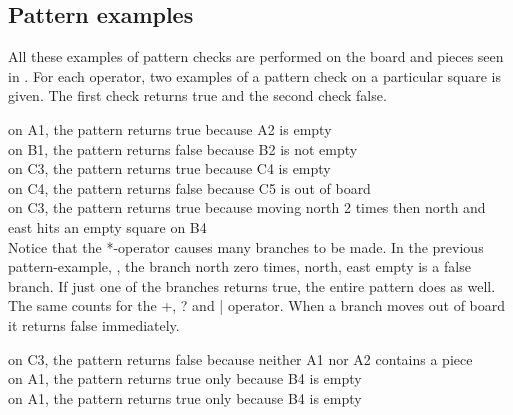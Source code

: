 \subsection{Pattern examples}
\label{sec:patternexamples}
All these examples of pattern checks are performed on the board and pieces seen in . For each operator, two examples of a pattern check on a particular square is given. The first check returns true and the second check false.

on A1, the pattern  returns true because A2 is empty\\
on B1, the pattern  returns false because B2 is not empty\\
on C3, the pattern  returns true because C4 is empty\\
on C4, the pattern  returns false because C5 is out of board\\
on C3, the pattern  returns true because moving north 2 times then north and east hits an empty square on B4\\

Notice that the *-operator causes many branches to be made. In the previous pattern-example, , the branch north zero times, north, east empty is a false branch. If just one of the branches returns true, the entire pattern does as well. The same counts for the +, ? and | operator. When a branch moves out of board it returns false immediately.

on C3, the pattern  returns false because neither A1 nor A2 contains a piece\\
on A1, the pattern  returns true only because B4 is empty\\
on A1, the pattern  returns true only because B4 is empty\\
